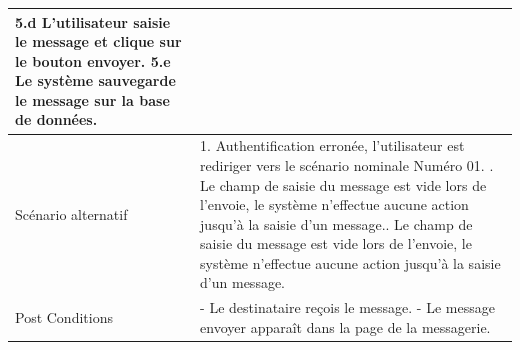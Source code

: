 \documentclass[french]{report}
\begin{document}
\begin{description}
\begin{minipage}{\linewidth}
\begin{tabular}{|m{3cm}|m{9cm}|}
                	5.d L'utilisateur saisie le message et clique sur le bouton envoyer. \newline
                	5.e Le système sauvegarde le message sur la base de données. \newline
                \\ 
            \hline
            Scénario alternatif &   
                1. Authentification erronée, l'utilisateur est rediriger vers le 
		scénario nominale Numéro 01. \newline
                4. Le champ de saisie du message est vide lors de l'envoie, le système 
		n'effectue aucune action jusqu'à la saisie d'un message.\newline
                5. Le champ de saisie du message est vide lors de l'envoie, le système
		n'effectue aucune action jusqu'à la saisie d'un message.\newline
                
            \\ 
            \hline
            Post Conditions & 
                - Le destinataire reçois le message. \newline
                - Le message envoyer apparaît dans la page de la messagerie.  \newline
            \\
            \hline
            \end{tabular}
        \end{minipage}
        

\end{description}
\end{document}
